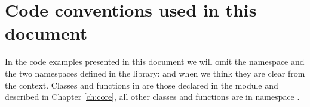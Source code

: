 \section{Code conventions used in this document}

In the code examples presented in this document we will omit the  namespace and the two namespaces defined in the library:  and  when we think they are clear from the context. Classes and functions in  are those declared in the  module and described in Chapter \ref{ch:core}, all other classes and functions are in namespace .
